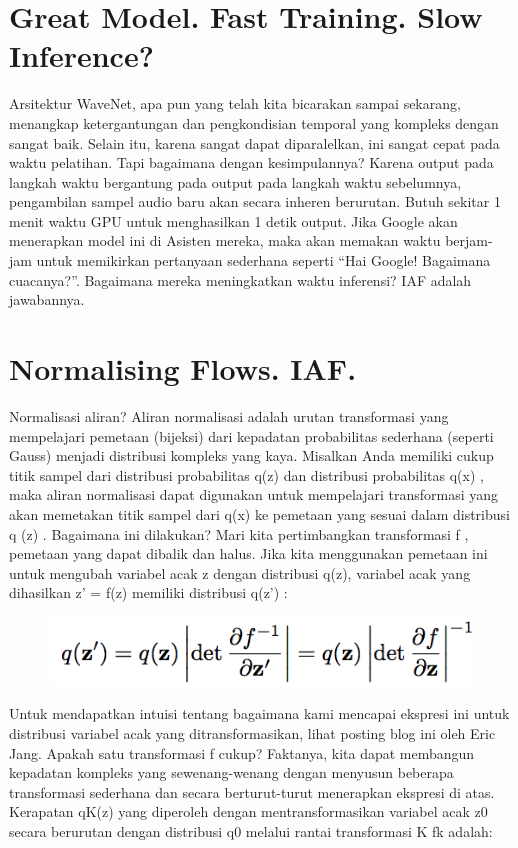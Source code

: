 \section{Great Model. Fast Training. Slow Inference?}
Arsitektur WaveNet, apa pun yang telah kita bicarakan sampai sekarang, menangkap ketergantungan dan pengkondisian temporal yang kompleks dengan sangat baik. Selain itu, karena sangat dapat diparalelkan, ini sangat cepat pada waktu pelatihan. Tapi bagaimana dengan kesimpulannya? Karena output pada langkah waktu bergantung pada output pada langkah waktu sebelumnya, pengambilan sampel audio baru akan secara inheren berurutan. Butuh sekitar 1 menit waktu GPU untuk menghasilkan 1 detik output. Jika Google akan menerapkan model ini di Asisten mereka, maka akan memakan waktu berjam-jam untuk memikirkan pertanyaan sederhana seperti “Hai Google! Bagaimana cuacanya?”. Bagaimana mereka meningkatkan waktu inferensi? IAF adalah jawabannya.

\section{Normalising Flows. IAF.}
Normalisasi aliran? Aliran normalisasi adalah urutan transformasi yang mempelajari pemetaan (bijeksi) dari kepadatan probabilitas sederhana (seperti Gauss) menjadi distribusi kompleks yang kaya. Misalkan Anda memiliki cukup titik sampel dari distribusi probabilitas q(z) dan distribusi probabilitas q(x) , maka aliran normalisasi dapat digunakan untuk mempelajari transformasi yang akan memetakan titik sampel dari q(x) ke pemetaan yang sesuai dalam distribusi q (z) . Bagaimana ini dilakukan? Mari kita pertimbangkan transformasi f , pemetaan yang dapat dibalik dan halus. Jika kita menggunakan pemetaan ini untuk mengubah variabel acak z dengan distribusi q(z), variabel acak yang dihasilkan z' = f(z) memiliki distribusi q(z') :

\begin{figure}[H]
        \centerline{\includegraphics[scale=.5]{figures/rumus9}}
		\label{rumus9}
\end{figure}

Untuk mendapatkan intuisi tentang bagaimana kami mencapai ekspresi ini untuk distribusi variabel acak yang ditransformasikan, lihat posting blog ini oleh Eric Jang. Apakah satu transformasi f cukup? Faktanya, kita dapat membangun kepadatan kompleks yang sewenang-wenang dengan menyusun beberapa transformasi sederhana dan secara berturut-turut menerapkan ekspresi di atas. Kerapatan qK(z) yang diperoleh dengan mentransformasikan variabel acak z0 secara berurutan dengan distribusi q0 melalui rantai transformasi K fk adalah:

